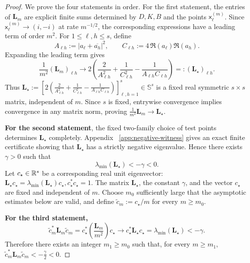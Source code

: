 \begin{proof}
We prove the four statements in order. 
For the first statement, the entries of $\mathbf L_m$ are explicit finite
sums determined by $D,K,B$ and the points $\mathsf x_\ell^{(m)}$.  Since
$
\mathsf x_\ell^{(m)}\to(i,-i)
$
at rate $m^{-1/2}$, the corresponding expressions have a leading term
of order $m^2$.  For $1\le\ell,h\le s$, define
\[
 A_{\ell h}:=
 |a_\ell+\overline{a_h}|^2,
 \qquad
 C_{\ell h}:=
 4\,\Re(a_\ell)\Re(a_h).
\]
Expanding the leading term gives
\[
 \frac{1}{m^2}(\mathbf L_m)_{\ell h}
 \longrightarrow
 2\left(
 \frac{2}{A_{\ell h}^2}
 +\frac{1}{C_{\ell h}^2}
 -\frac{1}{A_{\ell h}C_{\ell h}}
 \right)
 =:(\mathbf L_\star)_{\ell h}.
\]
Thus
$
 \mathbf L_\star:=
 \left[
 2\left(
 \frac{2}{A_{\ell h}^2}
 +\frac{1}{C_{\ell h}^2}
 -\frac{1}{A_{\ell h}C_{\ell h}}
 \right)
 \right]_{\ell,h=1}^s
 \in\mathbb S^s
$
is a fixed real symmetric $s\times s$ matrix, independent of $m$.  Since
$s$ is fixed, entrywise convergence implies convergence in any matrix
norm, proving
$
        \frac{1}{m^2}\mathbf L_m\longrightarrow\mathbf L_\star.
$

\noindent 
\textbf{For the second statement}, the fixed two-family choice of test points
determines $\mathbf L_\star$ completely.  Appendix~
\ref{app:negative-witness} gives an exact finite certificate showing that
$\mathbf L_\star$ has a strictly negative eigenvalue.  Hence there exists
$\gamma>0$ such that
\[
        \lambda_{\min}(\mathbf L_\star)<-\gamma<0.
\]
Let $c_\star\in\mathbb{R}^s$ be a corresponding real unit eigenvector:
$
 \mathbf L_\star c_\star
 =\lambda_{\min}(\mathbf L_\star)c_\star, 
 c_\star^*c_\star=1.
$
The matrix $\mathbf L_\star$, the constant $\gamma$, and the vector
$c_\star$ are fixed and independent of $m$.  Choose $m_0$ sufficiently
large that the asymptotic estimates below are valid, and define
$
\widetilde c_m:=c_\star/m
$
for every $m\ge m_0$.

\noindent
\textbf{For the third statement,}
\[
 \widetilde c_m^*\mathbf L_m\widetilde c_m
 =
 c_\star^*
 \left(\frac{\mathbf L_m}{m^2}\right)c_\star
 \longrightarrow
 c_\star^*\mathbf L_\star c_\star
 =
 \lambda_{\min}(\mathbf L_\star)
 <-\gamma.
\]
Therefore there exists an integer $m_1\ge m_0$ such that, for every
$m\ge m_1$,
$
 \widetilde c_m^*\mathbf L_m\widetilde c_m
 < -\frac{\gamma}{2}<0.
$


\end{proof}
